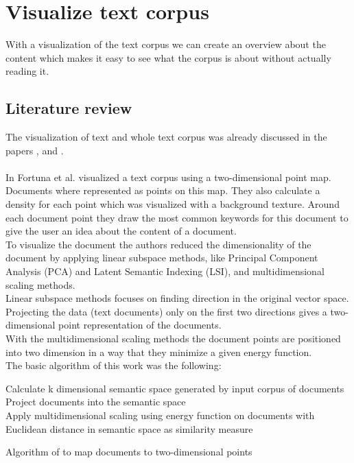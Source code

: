 \section{Visualize text corpus}

With a visualization of the text corpus we can create an overview about the content which makes it easy to see what the corpus is about without actually reading it. 

\subsection{Literature review}

The visualization of text and whole text corpus was already discussed in the papers  \cite{visualiuationCorpus1},  \cite{visualiuationCorpus2} and \cite{visualiuationCorpus3}. \\
\\
In  \cite{visualiuationCorpus1} Fortuna et al. visualized a text corpus using a two-dimensional point map. Documents where represented as points on this map. They also calculate a density for each point which was visualized with a background texture. Around each document point they draw the most common keywords for this document to give the user an idea about the content of a document. \\
To visualize the document the authors reduced the dimensionality of the document by applying linear subspace methods, like Principal Component Analysis (PCA) and Latent Semantic Indexing (LSI), and multidimensional scaling methods. \\
Linear subspace methods focuses on finding direction in the original vector space. Projecting the data (text documents) only on the first two directions gives a
two-dimensional point representation of the documents. \\
With the multidimensional scaling methods the document points are positioned into two dimension in a way that they minimize a given energy function. \\
The basic algorithm of this work was the following: 
\begin{algorithm}
	
	 Calculate k dimensional semantic space generated by input corpus of documents \\
	 Project documents into the semantic space \\
	 Apply multidimensional scaling using energy function on documents with Euclidean distance in semantic space as similarity measure 
	
	\caption{Algorithm of \cite{visualiuationCorpus1} to map documents to two-dimensional points}
\end{algorithm}

